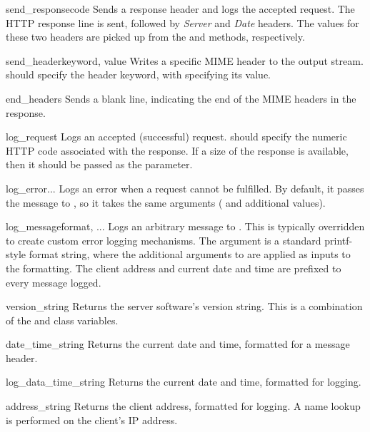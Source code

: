 \begin{funcdesc}{send_response}{code}
Sends a response header and logs the accepted request. The HTTP
response line is sent, followed by \emph{Server} and \emph{Date}
headers. The values for these two headers are picked up from the
 and  methods,
respectively.
\end{funcdesc}

\begin{funcdesc}{send_header}{keyword, value}
Writes a specific MIME header to the output stream. 
should specify the header keyword, with  specifying
its value.
\end{funcdesc}

\begin{funcdesc}{end_headers}{}
Sends a blank line, indicating the end of the MIME headers in
the response.
\end{funcdesc}

\begin{funcdesc}{log_request}{}
Logs an accepted (successful) request.  should specify
the numeric HTTP code associated with the response. If a size of
the response is available, then it should be passed as the
 parameter.
\end{funcdesc}

\begin{funcdesc}{log_error}{...}
Logs an error when a request cannot be fulfilled. By default,
it passes the message to , so it takes the
same arguments ( and additional values).
\end{funcdesc}

\begin{funcdesc}{log_message}{format, ...}
Logs an arbitrary message to . This is typically
overridden to create custom error logging mechanisms. The
 argument is a standard printf-style format string,
where the additional arguments to  are applied
as inputs to the formatting. The client address and current date
and time are prefixed to every message logged.
\end{funcdesc}

\begin{funcdesc}{version_string}{}
Returns the server software's version string. This is a combination
of the  and  class variables.
\end{funcdesc}

\begin{funcdesc}{date_time_string}{}
Returns the current date and time, formatted for a message header.
\end{funcdesc}

\begin{funcdesc}{log_data_time_string}{}
Returns the current date and time, formatted for logging.
\end{funcdesc}

\begin{funcdesc}{address_string}{}
Returns the client address, formatted for logging. A name lookup
is performed on the client's IP address.
\end{funcdesc}
